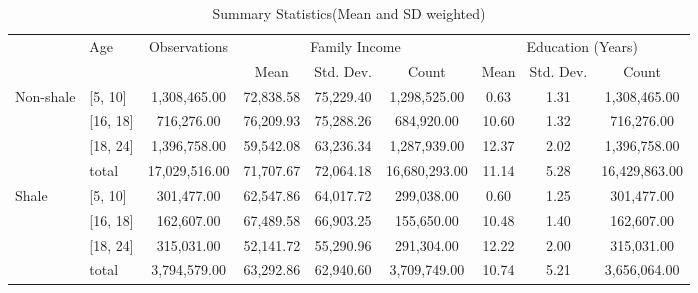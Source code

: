 \begin{table}[ht]
\centering
\tiny
\begin{tabular}{l|l||c|ccc|ccc}
 \hline
 & Age & Observations & \multicolumn{3}{c|}{Family Income} & \multicolumn{3}{c}{Education (Years)} \\
 & & & Mean & Std. Dev. & Count & Mean & Std. Dev. & Count \\
 \hline
 \multirow{4}{*}{Non-shale} & [5, 10] & 1,308,465.00 & 72,838.58 & 75,229.40 & 1,298,525.00 & 0.63 & 1.31 & 1,308,465.00 \\
 & [16, 18] & 716,276.00 & 76,209.93 & 75,288.26 & 684,920.00 & 10.60 & 1.32 & 716,276.00 \\
 & [18, 24] & 1,396,758.00 & 59,542.08 & 63,236.34 & 1,287,939.00 & 12.37 & 2.02 & 1,396,758.00 \\
 & total & 17,029,516.00 & 71,707.67 & 72,064.18 & 16,680,293.00 & 11.14 & 5.28 & 16,429,863.00 \\
 \multirow{4}{*}{Shale} & [5, 10] & 301,477.00 & 62,547.86 & 64,017.72 & 299,038.00 & 0.60 & 1.25 & 301,477.00 \\
 & [16, 18] & 162,607.00 & 67,489.58 & 66,903.25 & 155,650.00 & 10.48 & 1.40 & 162,607.00 \\
 & [18, 24] & 315,031.00 & 52,141.72 & 55,290.96 & 291,304.00 & 12.22 & 2.00 & 315,031.00 \\
 & total & 3,794,579.00 & 63,292.86 & 62,940.60 & 3,709,749.00 & 10.74 & 5.21 & 3,656,064.00 \\
 \hline
\end{tabular}
\caption{Summary Statistics(Mean and SD weighted)}
\label{tab:sum_stat}
\end{table}